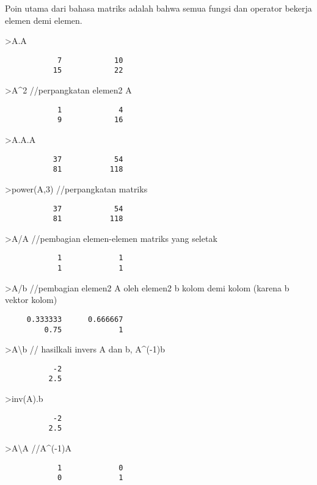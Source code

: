 \documentclass[
]{book}
\begin{document}
Poin utama dari bahasa matriks adalah bahwa semua fungsi dan operator bekerja elemen demi elemen.

\textgreater A.A

\begin{verbatim}
            7            10 
           15            22 
\end{verbatim}

\textgreater A\^{}2 //perpangkatan elemen2 A

\begin{verbatim}
            1             4 
            9            16 
\end{verbatim}

\textgreater A.A.A

\begin{verbatim}
           37            54 
           81           118 
\end{verbatim}

\textgreater power(A,3) //perpangkatan matriks

\begin{verbatim}
           37            54 
           81           118 
\end{verbatim}

\textgreater A/A //pembagian elemen-elemen matriks yang seletak

\begin{verbatim}
            1             1 
            1             1 
\end{verbatim}

\textgreater A/b //pembagian elemen2 A oleh elemen2 b kolom demi kolom (karena b vektor kolom)

\begin{verbatim}
     0.333333      0.666667 
         0.75             1 
\end{verbatim}

\textgreater A\textbackslash b // hasilkali invers A dan b, A\^{}(-1)b

\begin{verbatim}
           -2 
          2.5 
\end{verbatim}

\textgreater inv(A).b

\begin{verbatim}
           -2 
          2.5 
\end{verbatim}

\textgreater A\textbackslash A //A\^{}(-1)A

\begin{verbatim}
            1             0 
            0             1 
\end{verbatim}
\end{document}
